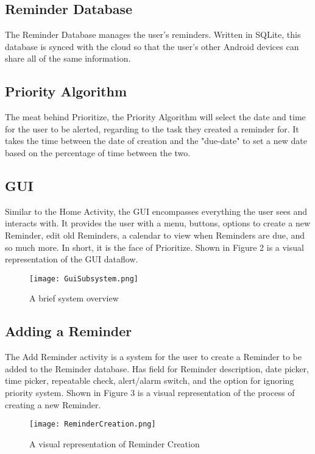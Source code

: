 \documentclass[12pt]{article}
\begin{document}
\subsection{Reminder Database}
The Reminder Database manages the user's reminders. Written in SQLite, this database is synced with the cloud so that the user's other Android devices can share all of the same information.


\subsection{Priority Algorithm}
The meat behind Prioritize, the Priority Algorithm will select the date and time for the user to be alerted, regarding to the task they created a reminder for. It takes the time between the date of creation and the "due-date" to set a new date based on the percentage of time between the two. 

\subsection{GUI}
Similar to the Home Activity, the GUI encompasses everything the user sees and interacts with. It provides the user with a menu, buttons, options to create a new Reminder, edit old Reminders, a calendar to view when Reminders are due, and so much more. In short, it is the face of Prioritize. Shown in Figure 2 is a visual representation of the GUI dataflow.

\begin{figure}[h]
\texttt{[image: GuiSubsystem.png]}
\centering
\caption{A brief system overview}
\end{figure}

\subsection{Adding a Reminder}
The Add Reminder activity is a system for the user to create a Reminder to be added to the Reminder database. Has field for Reminder description, date picker, time picker, repeatable check, alert/alarm switch, and the option for ignoring priority system. Shown in Figure 3 is a visual representation of the process of creating a new Reminder.

\begin{figure}[h]
\texttt{[image: ReminderCreation.png]}
\centering
\caption{A visual representation of Reminder Creation}
\end{figure}
\end{document}

